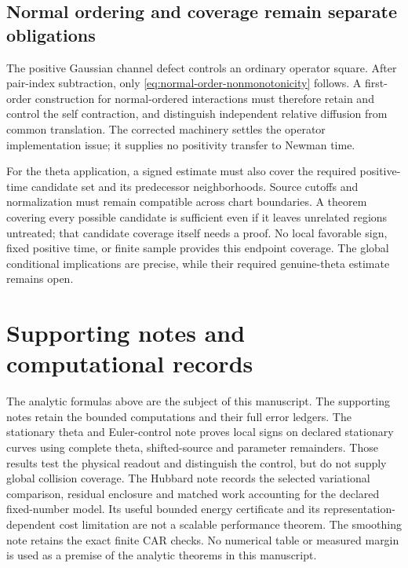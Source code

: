 \documentclass[11pt]{article}
\numberwithin{equation}{section}
\theoremstyle{definition}
\theoremstyle{remark}
\begin{document}
\subsection{Normal ordering and coverage remain separate obligations}
The positive Gaussian channel defect controls an ordinary operator square.
After pair-index subtraction, only
\eqref{eq:normal-order-nonmonotonicity} follows. A first-order construction
for normal-ordered interactions must therefore retain and control the
self contraction, and distinguish independent relative diffusion from
common translation. The corrected machinery settles the operator
implementation issue; it supplies no positivity transfer to Newman time.

For the theta application, a signed estimate must also cover the required
positive-time candidate set and its predecessor neighborhoods. Source
cutoffs and normalization must remain compatible across chart boundaries.
A theorem covering every possible candidate is sufficient even if it
leaves unrelated regions untreated; that candidate coverage itself needs
a proof. No local favorable sign, fixed positive time, or finite sample
provides this endpoint coverage. The global conditional implications are
precise, while their required genuine-theta estimate remains open.

\section{Supporting notes and computational records}\label{sec:records}
The analytic formulas above are the subject of this manuscript. The
supporting notes retain the bounded computations and their full error
ledgers. The stationary theta and Euler-control note
\cite{stationarycontrols} proves local signs on declared stationary curves
using complete theta, shifted-source and parameter remainders. Those
results test the physical readout and distinguish the control, but do not
supply global collision coverage.
The Hubbard note \cite{hubbardnote} records the selected variational
comparison, residual enclosure and matched work accounting for the
declared fixed-number model. Its useful bounded energy certificate and
its representation-dependent cost limitation are not a scalable
performance theorem. The smoothing note \cite{smoothingnote} retains the
exact finite CAR checks. No numerical table or measured margin is used
as a premise of the analytic theorems in this manuscript.
\end{document}

